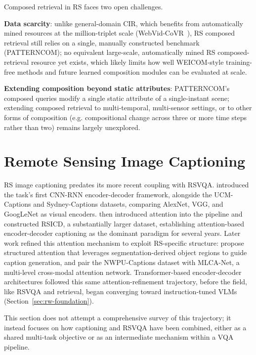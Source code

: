 Composed retrieval in RS faces two open challenges. 

\textbf{Data scarcity}: unlike general-domain CIR, which benefits from automatically mined resources at the million-triplet scale (WebVid-CoVR~\cite{ventura2024covr}), RS composed retrieval still relies on a single, manually constructed benchmark (PATTERNCOM); no equivalent large-scale, automatically mined RS composed-retrieval resource yet exists, which likely limits how well WEICOM-style training-free methods and future learned composition modules can be evaluated at scale. 

\textbf{Extending composition beyond static attributes}: PATTERNCOM's composed queries modify a single static attribute of a single-instant scene; extending composed retrieval to multi-temporal, multi-sensor settings, or to other forms of composition (e.g. compositional change across three or more time steps rather than two) remains largely unexplored.

\section{Remote Sensing Image Captioning}
\label{sec:rw-captioning}

RS image captioning predates its more recent coupling with RSVQA. \textcite{qu2016exploring} introduced the task's first CNN-RNN encoder-decoder framework, alongside the UCM-Captions and Sydney-Captions datasets, comparing AlexNet, VGG, and GoogLeNet as visual encoders. \textcite{lu2017exploring} then introduced attention into the pipeline and constructed RSICD, a substantially larger dataset, establishing attention-based encoder-decoder captioning as the dominant paradigm for several years. Later work refined this attention mechanism to exploit RS-specific structure: \textcite{zhao2021structured} propose structured attention that leverages segmentation-derived object regions to guide caption generation, and \textcite{cheng2022nwpu} pair the NWPU-Captions dataset with MLCA-Net, a multi-level cross-modal attention network. Transformer-based encoder-decoder architectures followed this same attention-refinement trajectory, before the field, like RSVQA and retrieval, began converging toward instruction-tuned VLMs (Section~\ref{sec:rw-foundation}).
 
This section does not attempt a comprehensive survey of this trajectory; it instead focuses on how captioning and RSVQA have been combined, either as a shared multi-task objective or as an intermediate mechanism within a VQA pipeline.
 
